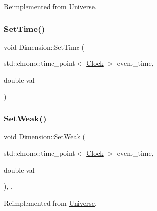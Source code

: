 Reimplemented from \mbox{\hyperlink{classUniverse_a1b2d6197ddf3d613cc30bd04d22ed8b7}{Universe}}.

\mbox{\label{classDimension_a0558d45fe020ba1d1895e521a411decb}} 
\subsubsection{\texorpdfstring{Set\+Time()}{SetTime()}}
{\footnotesize\ttfamily void Dimension\+::\+Set\+Time (\begin{DoxyParamCaption}\item[{std\+::chrono\+::time\+\_\+point$<$ \mbox{\hyperlink{universe_8h_a0ef8d951d1ca5ab3cfaf7ab4c7a6fd80}{Clock}} $>$}]{event\+\_\+time,  }\item[{double}]{val }\end{DoxyParamCaption})}

\mbox{\label{classDimension_a157cfa28dd6bc5518d622d01445ca827}} 
\subsubsection{\texorpdfstring{Set\+Weak()}{SetWeak()}}
{\footnotesize\ttfamily void Dimension\+::\+Set\+Weak (\begin{DoxyParamCaption}\item[{std\+::chrono\+::time\+\_\+point$<$ \mbox{\hyperlink{universe_8h_a0ef8d951d1ca5ab3cfaf7ab4c7a6fd80}{Clock}} $>$}]{event\+\_\+time,  }\item[{double}]{val }\end{DoxyParamCaption})\hspace{0.3cm}{\ttfamily [inline]}, {\ttfamily [final]}, {\ttfamily [virtual]}}



Reimplemented from \mbox{\hyperlink{classUniverse_a0f5cd04081b41ee931c0557dc397f6fb}{Universe}}.

\mbox{\label{classDimension_a1d2accef9e6adf747f5cc143ae4527c9}} 
